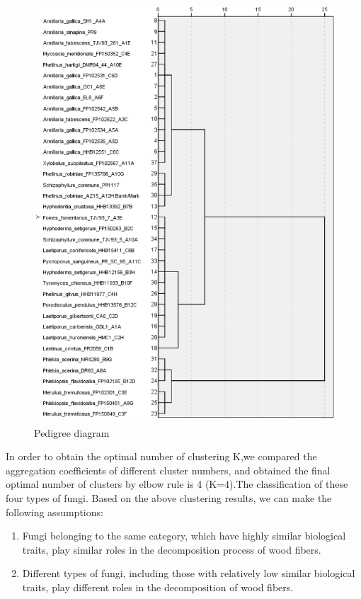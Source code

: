 \documentclass[12pt]{article}
\begin{document}
\begin{figure}[h] %
	\centering
	\includegraphics[scale=0.9]{pu-xi-tu.png}
	\caption{Pedigree diagram}
	\label{figure:Pedigree_diagram}
\end{figure}


In order to obtain the optimal number of clustering K,we compared the aggregation coefficients of different cluster numbers, and obtained the final optimal number of clusters by elbow rule is 4 (K=4).The classification of these four types of fungi.
Based on the above clustering results, we can make the following assumptions:\par


\begin{enumerate}[\bfseries 1.]
	\item Fungi belonging to the same category, which have highly similar biological traits, play similar roles in the decomposition process of wood fibers.\par
	\item Different types of fungi, including those with relatively low similar biological traits, play different roles in the decomposition of wood fibers.\par
\end{enumerate}\par
\end{document}
